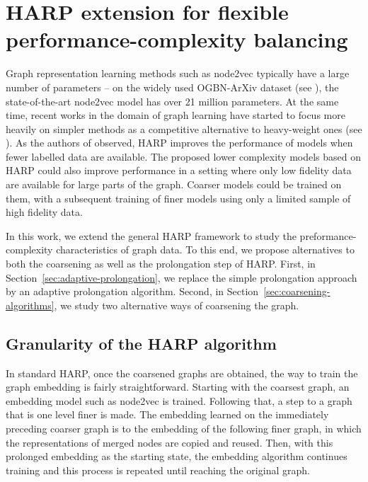 \section{HARP extension for flexible performance-complexity balancing}\label{sec:our-method}

Graph representation learning methods such as node2vec typically have a large number of parameters -- on the widely used OGBN-ArXiv dataset (see \cite{hu_open_2021}), the state-of-the-art node2vec model has over 21 million parameters. At the same time, recent works in the domain of graph learning have started to focus more heavily on simpler methods as a competitive alternative to heavy-weight ones (see \cite{frasca_sign_2020, huang_combining_2020}). As the authors of \cite{chen_harp_2018} observed, HARP improves the performance of models when fewer labelled data are available. The proposed lower complexity models based on HARP could also improve performance in a setting where only low fidelity data are available for large parts of the graph. Coarser models could be trained on them, with a subsequent training of finer models using only a limited sample of high fidelity data.

In this work, we extend the general HARP framework to study the preformance-complexity characteristics of graph data. To this end, we propose alternatives to both the coarsening as well as the prolongation step of HARP. First, in Section~\ref{sec:adaptive-prolongation}, we replace the simple prolongation approach by an adaptive prolongation algorithm. Second, in Section~\ref{sec:coarsening-algorithms}, we study two alternative ways of coarsening the graph.

\subsection{Granularity of the HARP algorithm}

In standard HARP, once the coarsened graphs are obtained, the way to train the graph embedding is fairly straightforward. Starting with the coarsest graph, an embedding model such as node2vec is trained. Following that, a step to a graph that is one level finer is made. The embedding learned on the immediately preceding coarser graph is  to the embedding of the following finer graph, in which the representations of merged nodes are copied and reused.
 Then, with this prolonged embedding as the starting state, the embedding algorithm continues training and this process is repeated until reaching the original graph.

